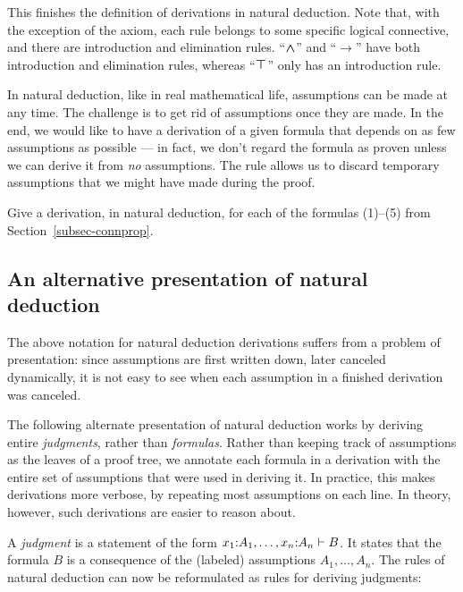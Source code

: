 \documentclass{article}
\begin{document}
This finishes the definition of derivations in natural deduction. Note
that, with the exception of the axiom, each rule belongs to some
specific logical connective, and there are introduction and
elimination rules. ``$\mathbin{\textrm{\rm\boldmath $\wedge$}}$'' and ``$\to$'' have both introduction
and elimination rules, whereas ``$\textrm{\rm\boldmath $\top$}$'' only has an introduction
rule.

In natural deduction, like in real mathematical life, assumptions can
be made at any time. The challenge is to get rid of assumptions once
they are made. In the end, we would like to have a derivation of a
given formula that depends on as few assumptions as possible --- in
fact, we don't regard the formula as proven unless we can derive it
from {\em no} assumptions. The rule {} allows us to
discard temporary assumptions that we might have made during the
proof.

\begin{exercise}
  Give a derivation, in natural deduction, for each of the formulas
  (1)--(5) from Section~\ref{subsec-connprop}.
\end{exercise}

\subsection{An alternative presentation of natural deduction}

The above notation for natural deduction derivations suffers from a
problem of presentation: since assumptions are first written down,
later canceled dynamically, it is not easy to see when each assumption
in a finished derivation was canceled. 

The following alternate presentation of natural deduction works by
deriving entire {\em judgments}, rather than {\em formulas}. Rather
than keeping track of assumptions as the leaves of a proof tree, we
annotate each formula in a derivation with the entire set of
assumptions that were used in deriving it. In practice, this makes
derivations more verbose, by repeating most assumptions on each line.
In theory, however, such derivations are easier to reason about.

A {\em judgment} is a statement of the form
$x_1{:}A_1,\ldots,x_n{:}A_n \vdash B$. It states that the
formula $B$ is a consequence of the (labeled) assumptions
$A_1,\ldots,A_n$. The rules of natural deduction can now be
reformulated as rules for deriving judgments:
\end{document}
